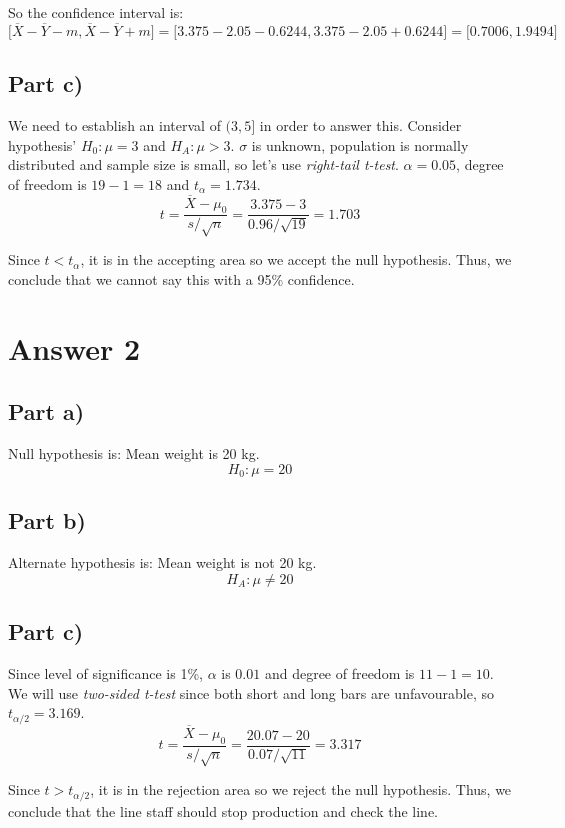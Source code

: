 \documentclass[12pt]{article}
\begin{document}
So the confidence interval is:
$$\bigg[\overline{X} - \overline{Y} - m, \overline{X} - \overline{Y} + m \bigg] = \bigg[3.375 - 2.05 - 0.6244, 3.375 - 2.05 + 0.6244 \bigg] = \bigg[0.7006
, 1.9494 \bigg]$$

\subsection*{Part c)}
We need to establish an interval of $(3, 5]$ in order to answer this. Consider hypothesis' $H_0 : \mu = 3$ and $H_A : \mu > 3$. $\sigma$ is unknown, population is normally distributed and sample size is small, so let's use \textit{right-tail t-test}. $\alpha = 0.05$, degree of freedom is $19-1 = 18$ and $t_\alpha = 1.734$.
$$t = \frac{\overline{X} - \mu_0}{s / \sqrt{n}} = \frac{3.375 - 3}{0.96 / \sqrt{19}} = 1.703$$

Since $t < t_{\alpha}$, it is in the accepting area so we accept the null hypothesis. Thus, we conclude that we cannot say this with a 95\% confidence.

\newpage

\section*{Answer 2}
\subsection*{Part a)}
Null hypothesis is: Mean weight is 20 kg.
$$H_0 : \mu = 20$$

\subsection*{Part b)}
Alternate hypothesis is: Mean weight is not 20 kg.
$$H_A : \mu \neq 20$$

\subsection*{Part c)}
Since level of significance is 1\%, $\alpha$ is $0.01$ and degree of freedom is $11-1 = 10$. We will use \textit{two-sided t-test} since both short and long bars are unfavourable, so $t_{\alpha/2} = 3.169$.
$$t = \frac{\overline{X} - \mu_0}{s / \sqrt{n}} = \frac{20.07 - 20}{0.07 / \sqrt{11}} = 3.317$$

Since $t > t_{\alpha/2}$, it is in the rejection area so we reject the null hypothesis. Thus, we conclude that the line staff should stop production and check the line.
\end{document}
